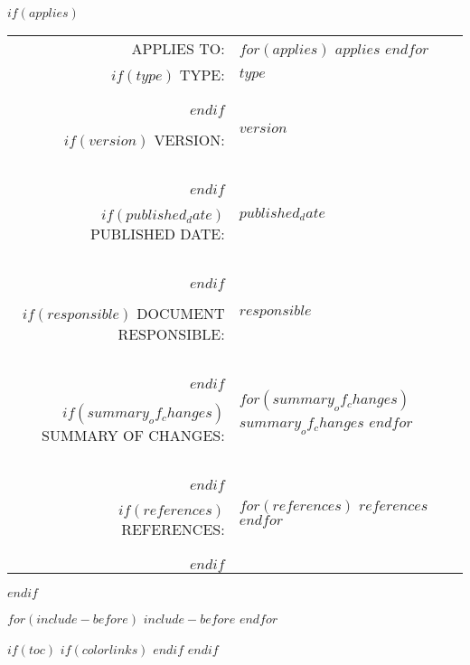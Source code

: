 \documentclass[$if(fontsize)$$fontsize$,$endif$$if(lang)$$babel-lang$,$endif$$if(papersize)$$papersize$paper,$endif$$for(classoption)$$classoption$$sep$,$endfor$]{$documentclass$}
\begin{document}
$if(applies)$
    \vspace*{5cm}
    \begin{center}
        \begin{tabular}{ r l }

            {\color{gray}APPLIES TO:}               & \parbox[t]{8cm}{$for(applies)$ \textbf{$applies$} \\ $endfor$} \\

            $if(type)$
            {\color{gray}TYPE:}                     & \parbox[t]{8cm}{\textbf{$type$}} \\
            $endif$

            $if(version)$
            {\color{gray}VERSION:}                  & \parbox[t]{8cm}{$version$} \\
            $endif$

            $if(published_date)$
            {\color{gray}PUBLISHED DATE:}           & \parbox[t]{8cm}{$published_date$} \\
            $endif$

            $if(responsible)$
            {\color{gray}DOCUMENT RESPONSIBLE:}     & \parbox[t]{8cm}{$responsible$} \\
            $endif$

            $if(summary_of_changes)$
            {\color{gray}SUMMARY OF CHANGES:}       & \parbox[t]{8cm}{$for(summary_of_changes)$ $summary_of_changes$ \\ $endfor$} \\
            $endif$

            $if(references)$
            {\color{gray}REFERENCES:}               & \parbox[t]{8cm}{$for(references)$ $references$ \\ $endfor$} \\
            $endif$

        \end{tabular}
    \end{center}
    \newpage
$endif$

$for(include-before)$
    $include-before$
    \newpage
$endfor$

\vspace*{1cm}

$if(toc)$
    {
        $if(colorlinks)$
            \hypersetup{linkcolor=$if(toccolor)$$toccolor$$else$black$endif$}
        $endif$
        \setcounter{tocdepth}{$toc-depth$}
        \tableofcontents
        \newpage
    }
$endif$
\end{document}

